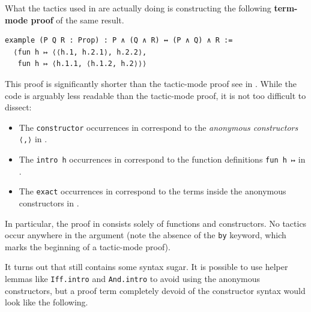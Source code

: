 What the tactics used in  are actually doing is constructing the following \textbf{term-mode proof} of the same result.

\begin{lstlisting}[caption=A term-mode proof of the associativity of $\land$, label=Ch5:Listing:And_assoc_term]
example (P Q R : Prop) : P ∧ (Q ∧ R) ↔ (P ∧ Q) ∧ R :=
  ⟨fun h ↦ ⟨⟨h.1, h.2.1⟩, h.2.2⟩,
   fun h ↦ ⟨h.1.1, ⟨h.1.2, h.2⟩⟩⟩
\end{lstlisting}


This proof is significantly shorter than the tactic-mode proof see in . While the code is arguably less readable than the tactic-mode proof, it is not too difficult to dissect:
\begin{itemize}
    \item The \lstinline|constructor| occurrences in  correspond to the \textit{anonymous constructors} \lstinline|⟨,⟩| in .

    \item The \lstinline|intro h| occurrences in  correspond to the function definitions \lstinline|fun h ↦| in .

    \item The \lstinline|exact| occurrences in  correspond to the terms inside the anonymous constructors in .
\end{itemize}

In particular, the proof in  consists solely of functions and constructors. No tactics occur anywhere in the argument (note the absence of the \lstinline|by| keyword, which marks the beginning of a tactic-mode proof).

It turns out that  still contains some syntax sugar. It is possible to use helper lemmas like \verb|Iff.intro| and \verb|And.intro| to avoid using the anonymous constructors, but a proof term completely devoid of the constructor syntax would look like the following.

